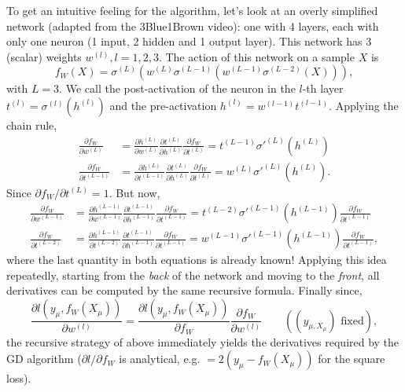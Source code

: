 \documentclass{article}
\begin{document}
To get an intuitive feeling for the algorithm, let's look at an overly simplified network (adapted from the 3Blue1Brown video): one with 4 layers, each with only one neuron (1 input, 2 hidden and 1 output layer). This network has 3 (scalar) weights $w^{(l)}, l=1,2,3$. The action of this network on a sample $X$ is
\begin{equation}
    f_W(X)
    =
    \sigma^{(L)}\left(
        w^{(L)}\sigma^{(L-1)}\left(
            w^{(L-1)}\sigma^{(L-2)}\left(
                X
            \right)
        \right)
    \right),
\end{equation}
with $L=3$. We call the post-activation of the neuron in the $l$-th layer $t^{(l)} = \sigma^{(l)}(h^{(l)})$ and the pre-activation $h^{(l)} = w^{(l-1)} t^{(l-1)}$.
Applying the chain rule,
\begin{align}
    \frac{\partial f_W}{\partial w^{(L)}}
    &=
    \frac{\partial h^{(L)}}{\partial w^{(L)}}
    \frac{\partial t^{(L)}}{\partial h^{(L)}}
    \frac{\partial f_W}{\partial t^{(L)}}
    =
    t^{(L-1)} \sigma'^{(L)} (h^{(L)}) \\
    \frac{\partial f_W}{\partial t^{(L-1)}}
    &=
    \frac{\partial h^{(L)}}{\partial t^{(L-1)}}
    \frac{\partial t^{(L)}}{\partial h^{(L)}}
    \frac{\partial f_W}{\partial t^{(L)}}
    =
    w^{(L)} \sigma'^{(L)} (h^{(L)}).
\end{align}
Since $\partial f_W / \partial t^{(L)} = 1$. But now,
\begin{align}
    \frac{\partial f_W}{\partial w^{(L-1)}}
    &=
    \frac{\partial h^{(L-1)}}{\partial w^{(L-1)}}
    \frac{\partial t^{(L-1)}}{\partial h^{(L-1)}}
    \frac{\partial f_W}{\partial t^{(L-1)}}
    =
    t^{(L-2)}\sigma'^{(L-1)}(h^{(L-1)})
    \frac{\partial f_W}{\partial t^{(L-1)}} \\
    \frac{\partial f_W}{\partial t^{(L-2)}}
    &=
    \frac{\partial h^{(L-1)}}{\partial t^{(L-2)}}
    \frac{\partial t^{(L-1)}}{\partial h^{(L-1)}}
    \frac{\partial f_W}{\partial t^{(L-1)}}
    =
    w^{(L-1)}\sigma'^{(L-1)}(h^{(L-1)})
    \frac{\partial f_W}{\partial t^{(L-1)}},
\end{align}
where the last quantity in both equations is already known! Applying this idea repeatedly, starting from the \emph{back} of the network and moving to the \emph{front}, all derivatives can be computed by the same recursive formula. Finally since,
\begin{equation}
    \frac{\partial l(y_{\mu}, f_W(X_{\mu}))}{\partial w^{(l)}}
    =
    \frac{\partial l(y_{\mu}, f_W(X_{\mu}))}{\partial f_W}
    \frac{\partial f_W}{\partial w^{(l)}}
    \quad \quad \left((y_{\mu,X_{\mu}}) \text{ fixed}\right),
\end{equation}
the recursive strategy of above immediately yields the derivatives required by the GD algorithm ($\partial l / \partial f_W$ is analytical, e.g. $=2(y_{\mu} - f_W(X_{\mu}))$ for the square loss).
\end{document}
